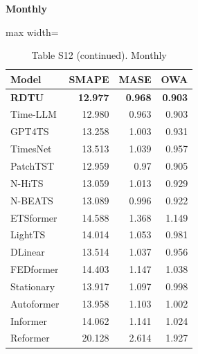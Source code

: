 \begin{table}[H]\centering\small
\caption*{Table S12 (continued). Monthly}
\textbf{Monthly}\par\smallskip
\begin{adjustbox}{max width=\linewidth}\begin{tabular}{lrrr}\toprule
\textbf{Model} & \textbf{SMAPE} & \textbf{MASE} & \textbf{OWA}\\\midrule
\rowcolor{blue!5}
\textbf{RDTU} & \textbf{12.977} & \textbf{0.968} & \textbf{0.903}\\
Time-LLM & 12.980 & 0.963 & 0.903\\
GPT4TS & 13.258 & 1.003 & 0.931\\
TimesNet & 13.513 & 1.039 & 0.957\\
PatchTST & 12.959 & 0.97 & 0.905\\
N-HiTS & 13.059 & 1.013 & 0.929\\
N-BEATS & 13.089 & 0.996 & 0.922\\
ETSformer & 14.588 & 1.368 & 1.149\\
LightTS & 14.014 & 1.053 & 0.981\\
DLinear & 13.514 & 1.037 & 0.956\\
FEDformer & 14.403 & 1.147 & 1.038\\
Stationary & 13.917 & 1.097 & 0.998\\
Autoformer & 13.958 & 1.103 & 1.002\\
Informer & 14.062 & 1.141 & 1.024\\
Reformer & 20.128 & 2.614 & 1.927\\
\bottomrule\end{tabular}\end{adjustbox}\end{table}
